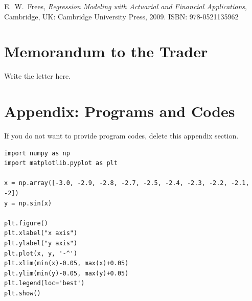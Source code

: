 \documentclass[12pt,a4paper]{article}
\begin{document}
\begin{spacing}{1.2}
\begin{thebibliography}{00}
E.~W.~Frees, \textit{Regression Modeling with Actuarial and Financial Applications}, Cambridge, UK: Cambridge University Press, 2009. ISBN: 978-0521135962

\end{thebibliography}


\addtocounter{page}{-1}
\thispagestyle{empty}

\newpage
\addtocounter{page}{-1}
\thispagestyle{empty}

{\centering\section*{Memorandum to the Trader}}

Write the letter here.



\end{spacing}


\newpage
\appendix
\addtocounter{page}{-1}
\thispagestyle{empty}



\section*{Appendix: Programs and Codes}

If you do not want to provide program codes, delete this appendix section.
\\


\begin{minipage}{1\linewidth}
\small{
\begin{lstlisting}
import numpy as np
import matplotlib.pyplot as plt

x = np.array([-3.0, -2.9, -2.8, -2.7, -2.5, -2.4, -2.3, -2.2, -2.1, -2])
y = np.sin(x)

plt.figure()
plt.xlabel("x axis")
plt.ylabel("y axis")
plt.plot(x, y, '-^')
plt.xlim(min(x)-0.05, max(x)+0.05)
plt.ylim(min(y)-0.05, max(y)+0.05)
plt.legend(loc='best')
plt.show()
\end{lstlisting}
}
\end{minipage}
\end{document}
